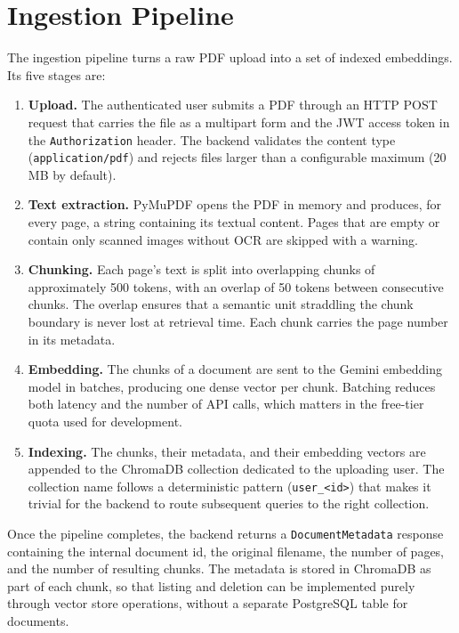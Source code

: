 \section{Ingestion Pipeline}
\label{sec:ingestion}

The ingestion pipeline turns a raw PDF upload into a set of indexed
embeddings. Its five stages are:

\begin{enumerate}
  \item \textbf{Upload.} The authenticated user submits a PDF through an
        HTTP POST request that carries the file as a multipart form and the
        JWT access token in the \texttt{Authorization} header. The backend
        validates the content type (\texttt{application/pdf}) and rejects
        files larger than a configurable maximum (20\,MB by default).
  \item \textbf{Text extraction.} PyMuPDF opens the PDF in memory and
        produces, for every page, a string containing its textual content.
        Pages that are empty or contain only scanned images without OCR are
        skipped with a warning.
  \item \textbf{Chunking.} Each page's text is split into overlapping
        chunks of approximately 500 tokens, with an overlap of 50 tokens
        between consecutive chunks. The overlap ensures that a semantic
        unit straddling the chunk boundary is never lost at retrieval
        time. Each chunk carries the page number in its metadata.
  \item \textbf{Embedding.} The chunks of a document are sent to the Gemini
        embedding model in batches, producing one dense vector per chunk.
        Batching reduces both latency and the number of API calls, which
        matters in the free-tier quota used for development.
  \item \textbf{Indexing.} The chunks, their metadata, and their embedding
        vectors are appended to the ChromaDB collection dedicated to the
        uploading user. The collection name follows a deterministic pattern
        (\texttt{user\_<id>}) that makes it trivial for the backend to
        route subsequent queries to the right collection.
\end{enumerate}

Once the pipeline completes, the backend returns a \texttt{DocumentMetadata}
response containing the internal document id, the original filename, the
number of pages, and the number of resulting chunks. The metadata is stored
in ChromaDB as part of each chunk, so that listing and deletion can be
implemented purely through vector store operations, without a separate
PostgreSQL table for documents.


